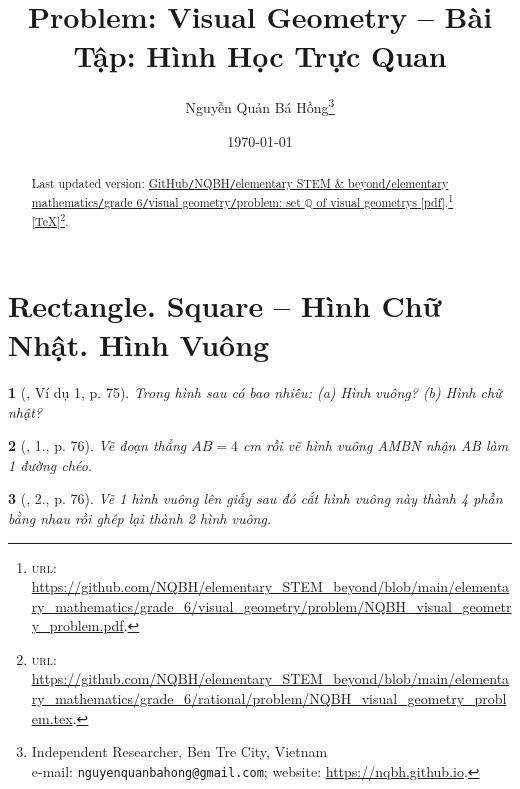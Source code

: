 \documentclass{article}
\title{Problem: Visual Geometry -- Bài Tập: Hình Học Trực Quan}
\author{Nguyễn Quản Bá Hồng\footnote{Independent Researcher, Ben Tre City, Vietnam\\e-mail: \texttt{nguyenquanbahong@gmail.com}; website: \url{https://nqbh.github.io}.}}
\date{\today}
\newtheorem{baitoan}{}
\begin{document}
\maketitle
\begin{abstract}
	Last updated version: \href{https://github.com/NQBH/elementary_STEM_beyond/blob/main/elementary_mathematics/grade_6/visual_geometry/problem/NQBH_visual_geometry_problem.pdf}{GitHub{\tt/}NQBH{\tt/}elementary STEM \& beyond{\tt/}elementary mathematics{\tt/}grade 6{\tt/}visual geometry{\tt/}problem: set $\mathbb{Q}$ of visual geometrys [pdf]}.\footnote{\textsc{url}: \url{https://github.com/NQBH/elementary_STEM_beyond/blob/main/elementary_mathematics/grade_6/visual_geometry/problem/NQBH_visual_geometry_problem.pdf}.} [\href{https://github.com/NQBH/elementary_STEM_beyond/blob/main/elementary_mathematics/grade_6/visual_geometry/problem/NQBH_visual_geometry_problem.tex}{\TeX}]\footnote{\textsc{url}: \url{https://github.com/NQBH/elementary_STEM_beyond/blob/main/elementary_mathematics/grade_6/rational/problem/NQBH_visual_geometry_problem.tex}.}. 
\end{abstract}
\tableofcontents


\section{Rectangle. Square -- Hình Chữ Nhật. Hình Vuông}

\begin{baitoan}[\cite{Tuyen_Toan_6}, Ví dụ 1, p. 75]
	Trong hình sau có bao nhiêu: (a) Hình vuông? (b) Hình chữ nhật?
	\begin{center}
	\end{center}	
\end{baitoan}

\begin{baitoan}[\cite{Tuyen_Toan_6}, 1., p. 76]
	Vẽ đoạn thẳng $AB = 4$ {\rm cm} rồi vẽ hình vuông AMBN nhận AB làm 1 đường chéo.
\end{baitoan}

\begin{baitoan}[\cite{Tuyen_Toan_6}, 2., p. 76]
	Vẽ 1 hình vuông lên giấy sau đó cắt hình vuông này thành 4 phần bằng nhau rồi ghép lại thành 2 hình vuông.
\end{baitoan}
\end{document}
